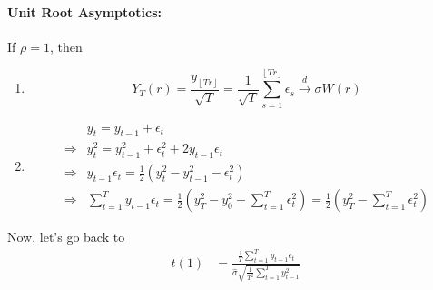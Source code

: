\documentclass[11pt]{elegantbook}
\begin{document}
\paragraph*{Unit Root Asymptotics:}
\begin{lemma}
    If $\rho=1$, then
    \begin{enumerate}
        \item $$Y_T(r)=\frac{y_{\left\lfloor Tr\right\rfloor}}{\sqrt{T}}=\frac{1}{\sqrt{T}}\sum_{s=1}^{\left\lfloor Tr\right\rfloor}\epsilon_s \stackrel{d}{\longrightarrow} \sigma W(r)$$
        \item
        \begin{equation}
            \begin{aligned}
                &y_t=y_{t-1}+\epsilon_t\\ \Rightarrow &y_t^2=y_{t-1}^2+\epsilon_t^2+2y_{t-1}\epsilon_t\\
                \Rightarrow &y_{t-1}\epsilon_t=\frac{1}{2}\left(y_t^2-y_{t-1}^2-\epsilon_t^2\right)\\
                \Rightarrow &\sum_{t=1}^Ty_{t-1}\epsilon_t=\frac{1}{2}\left(y_T^2-y_0^2-\sum_{t=1}^T\epsilon_t^2\right)=\frac{1}{2}\left(y_T^2-\sum_{t=1}^T\epsilon_t^2\right)
            \end{aligned}
            \nonumber
        \end{equation}
    \end{enumerate}
\end{lemma}
Now, let's go back to
\begin{equation}
    \begin{aligned}
        t(1)&=\frac{\frac{1}{T}\sum_{t=1}^Ty_{t-1}\epsilon_t}{\hat{\sigma}\sqrt{\frac{1}{T^2}\sum_{t=1}^Ty_{t-1}^2}}
    \end{aligned}
    \nonumber
\end{equation}
\end{document}
